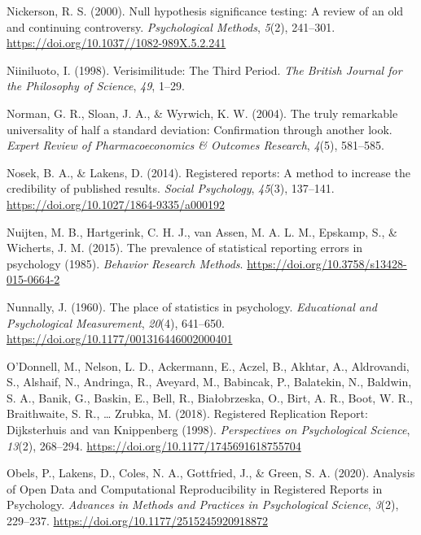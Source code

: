 \documentclass[
  oneside]{krantz}
\newlength{\cslhangindent}
\newlength{\cslentryspacingunit} %
\newenvironment{CSLReferences}[2] %
 {%
  \setlength{\parindent}{0pt}
  \ifodd #1
  \let\oldpar\par
  \def\par{\hangindent=\cslhangindent\oldpar}
  \fi
  \setlength{\parskip}{#2\cslentryspacingunit}
 }%
 {}
\begin{document}
\begin{CSLReferences}{1}{0}
\leavevmode{}%
Nickerson, R. S. (2000). Null hypothesis significance testing: {A}
review of an old and continuing controversy. \emph{Psychological
Methods}, \emph{5}(2), 241--301.
\url{https://doi.org/10.1037//1082-989X.5.2.241}

\leavevmode{}%
Niiniluoto, I. (1998). Verisimilitude: {The Third Period}. \emph{The
British Journal for the Philosophy of Science}, \emph{49}, 1--29.

\leavevmode{}%
Norman, G. R., Sloan, J. A., \& Wyrwich, K. W. (2004). The truly
remarkable universality of half a standard deviation: Confirmation
through another look. \emph{Expert Review of Pharmacoeconomics \&
Outcomes Research}, \emph{4}(5), 581--585.

\leavevmode{}%
Nosek, B. A., \& Lakens, D. (2014). Registered reports: {A} method to
increase the credibility of published results. \emph{Social Psychology},
\emph{45}(3), 137--141. \url{https://doi.org/10.1027/1864-9335/a000192}

\leavevmode{}%
Nuijten, M. B., Hartgerink, C. H. J., van Assen, M. A. L. M., Epskamp,
S., \& Wicherts, J. M. (2015). The prevalence of statistical reporting
errors in psychology (1985). \emph{Behavior Research
Methods}. \url{https://doi.org/10.3758/s13428-015-0664-2}

\leavevmode{}%
Nunnally, J. (1960). The place of statistics in psychology.
\emph{Educational and Psychological Measurement}, \emph{20}(4),
641--650. \url{https://doi.org/10.1177/001316446002000401}

\leavevmode{}%
O'Donnell, M., Nelson, L. D., Ackermann, E., Aczel, B., Akhtar, A.,
Aldrovandi, S., Alshaif, N., Andringa, R., Aveyard, M., Babincak, P.,
Balatekin, N., Baldwin, S. A., Banik, G., Baskin, E., Bell, R.,
Białobrzeska, O., Birt, A. R., Boot, W. R., Braithwaite, S. R., \ldots{}
Zrubka, M. (2018). Registered {Replication Report}: {Dijksterhuis} and
van {Knippenberg} (1998). \emph{Perspectives on Psychological Science},
\emph{13}(2), 268--294. \url{https://doi.org/10.1177/1745691618755704}

\leavevmode{}%
Obels, P., Lakens, D., Coles, N. A., Gottfried, J., \& Green, S. A.
(2020). Analysis of {Open Data} and {Computational Reproducibility} in
{Registered Reports} in {Psychology}. \emph{Advances in Methods and
Practices in Psychological Science}, \emph{3}(2), 229--237.
\url{https://doi.org/10.1177/2515245920918872}


\end{CSLReferences}
\end{document}
